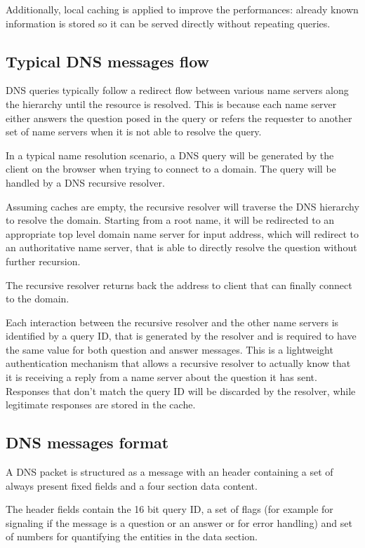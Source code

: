 \documentclass[11pt,a4paper]{article}
\begin{document}
\noindent
Additionally, local caching is applied to improve the performances: already known information is stored so it can be served directly without repeating queries.

\subsection{Typical DNS messages flow}
DNS queries typically follow a redirect flow between various name servers along the hierarchy until the resource is resolved. This is because each name server either answers the question posed in the query or refers the requester to another set of name servers when it is not able to resolve the query.

\hfill \break
\noindent
In a typical name resolution scenario, a DNS query will be generated by the client on the browser when trying to connect to a domain. The query will be handled by a DNS recursive resolver.

\noindent
Assuming caches are empty, the recursive resolver will traverse the DNS hierarchy to resolve the domain. Starting from a root name, it will be redirected to an appropriate top level domain name server for input address, which will redirect to an authoritative name server, that is able to directly resolve the question without further recursion.

\noindent
The recursive resolver returns back the address to client that can finally connect to the domain.

\hfill \break
\noindent
Each interaction between the recursive resolver and the other name servers is identified by a query ID, that is generated by the resolver and is required to have the same value for both question and answer messages. This is a lightweight authentication mechanism that allows a recursive resolver to actually know that it is receiving a reply from a name server about the question it has sent. Responses that don't match the query ID will be discarded by the resolver, while legitimate responses are stored in the cache.

\subsection{DNS messages format}

A DNS packet is structured as a message with an header containing a set of always present fixed fields and a four section data content.

\noindent
The header fields contain the 16 bit query ID, a set of flags (for example for signaling if the message is a question or an answer or for error handling) and set of numbers for quantifying the entities in the data section.
\end{document}

